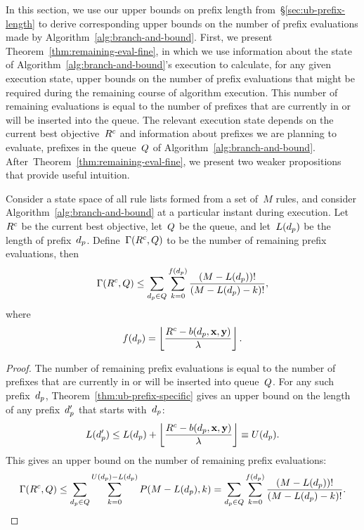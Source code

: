 In this section, we use our upper bounds on prefix length
from~\S\ref{sec:ub-prefix-length} to derive corresponding
upper bounds on the number of prefix evaluations made by
Algorithm~\ref{alg:branch-and-bound}.
%
First, we present Theorem~\ref{thm:remaining-eval-fine},
in which we use information about the state of
Algorithm~\ref{alg:branch-and-bound}'s execution
to calculate, for any given execution state,
upper bounds on the number of prefix evaluations that might
be required during the remaining course of algorithm execution.
%
This number of remaining evaluations is equal to the number of
prefixes that are currently in or will be inserted into the queue.
%
The relevant execution state depends on the current
best objective~${R^c}$ and information about
prefixes we are planning to evaluate, \ie prefixes in the
queue~$Q$ of Algorithm~\ref{alg:branch-and-bound}.
%
After~Theorem~\ref{thm:remaining-eval-fine}, we present two
weaker propositions that provide useful intuition.

\begin{theorem}
\label{thm:remaining-eval-fine}
Consider a state space of all rule lists formed from a set of~$M$ rules,
and consider Algorithm~\ref{alg:branch-and-bound} at a particular instant
during execution.
%
Let~${R^c}$ be the current best objective, let~$Q$ be the queue,
and let~$L(d_p)$ be the length of prefix~$d_p$.
%
Define~${\Gamma({R^c}, Q)}$ to be the number of remaining
prefix evaluations, then
\begin{align}
\Remaining(\CurrentObj, \Queue)
\le \sum_{\Prefix \in Q} \sum_{k=0}^{f(\Prefix)} \frac{(M - L(\Prefix))!}{(M - L(\Prefix) - k)!},
\end{align}
where
\begin{align}
f(\Prefix) = \left\lfloor \frac{\CurrentObj - b(\Prefix, \x, \y)}{\Reg} \right\rfloor.
\label{eq:f}
\end{align}
\end{theorem}

\begin{proof}
The number of remaining prefix evaluations is equal to the number of
prefixes that are currently in or will be inserted into queue~$Q$.
%
For any such prefix~$d_p$, Theorem~\ref{thm:ub-prefix-specific}
gives an upper bound on the length of any prefix~$d_p'$
that starts with~$d_p$:
\begin{align}
L(\Prefix') \le L(\Prefix) + \left\lfloor \frac{\CurrentObj - b(\Prefix, \x, \y)}{\Reg} \right\rfloor
\equiv U(\Prefix).
\end{align}
This gives an upper bound on the number of remaining prefix evaluations:
\begin{align}
\Remaining(\CurrentObj, \Queue)
\le \sum_{\Prefix \in Q} \sum_{k=0}^{U(\Prefix) - L(\Prefix)} P(M - L(\Prefix), k)
= \sum_{\Prefix \in Q} \sum_{k=0}^{f(\Prefix)} \frac{(M - L(\Prefix))!}{(M - L(\Prefix) - k)!}.
\end{align}
\end{proof}

